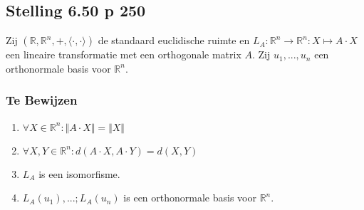 \documentclass[lineaire_algebra_oplossingen.tex]{subfiles}
\begin{document}
\subsection{Stelling 6.50 p 250}
\label{6.50}
Zij $(\mathbb{R},\mathbb{R}^n,+,\langle \cdot , \cdot \rangle)$ de standaard euclidische ruimte   en $L_A : \mathbb{R}^n \rightarrow \mathbb{R}^n: X \mapsto A \cdot X$ een lineaire transformatie met een orthogonale matrix $A$. Zij $u_1,...,u_n$ een orthonormale basis voor $\mathbb{R}^n$.

\subsubsection*{Te Bewijzen}
\begin{enumerate}
\item $\forall X \in \mathbb{R}^n: \Vert A \cdot X \Vert = \Vert X \Vert$

\item $\forall X,Y \in \mathbb{R}^n: d(A\cdot X,A\cdot Y) = d(X,Y)$

\item $L_A$ is een isomorfisme.

\item $L_A(u_1),...;L_A(u_n)$ is een orthonormale basis voor $\mathbb{R}^n$.

\end{enumerate}
\end{document}
